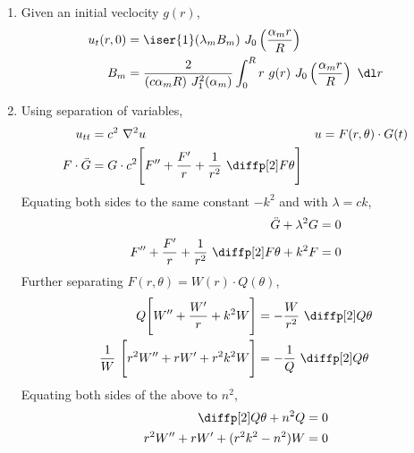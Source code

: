 \begin{enumerate}
    \item Given an initial veclocity $ g(r) $,
          \begin{align}
              u_t(r, 0) & = \iser{1} (\lambda_m B_m)
              \ J_0\left( \frac{\alpha_mr}{R} \right)                              \\
              B_m       & = \frac{2}{(c\alpha_m R)\ J_1^2(\alpha_m)} \int_{0}^{R}r
              \ g(r)\ J_0 \left( \frac{\alpha_m r}{R} \right)\ \dl r
          \end{align}

    \item Using separation of variables,
          \begin{align}
              u_{tt}           & = c^2\ \nabla^2 u                        &
              u                & = F(r, \theta) \cdot G(t)                  \\
              F \cdot \ddot{G} & = G \cdot c^2  \Bigg[ F'' + \frac{F'}{r}
                  + \frac{1}{r^2}\ \diffp[2] F\theta \Bigg]
          \end{align}
          Equating both sides to the same constant $ -k^2 $ and with $ \lambda = ck $,
          \begin{align}
              \ddot{G} + \lambda^2G                                        & = 0 \\
              F'' + \frac{F'}{r} + \frac{1}{r^2}\ \diffp[2] F\theta + k^2F & = 0
          \end{align}
          Further separating $ F(r, \theta) = W(r) \cdot Q(\theta) $,
          \begin{align}
              Q \Bigg[W'' + \frac{W'}{r} + k^2W\Bigg]         &
              = -\frac{W}{r^2}\ \diffp[2] Q\theta               \\
              \frac{1}{W}\ \Bigg[r^2W'' + rW' + r^2k^2W\Bigg] &
              = -\frac{1}{Q}\ \diffp[2] Q\theta                 \\
          \end{align}
          Equating both sides of the above to $ n^2 $,
          \begin{align}
              \diffp[2] Q\theta + n^2Q       & = 0 \\
              r^2W'' + rW' + (r^2k^2 - n^2)W & = 0
          \end{align}


\end{enumerate}
